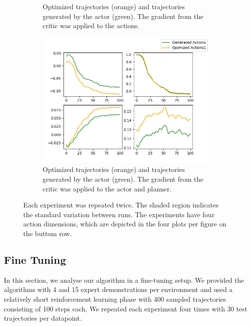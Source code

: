 \begin{figure}[htbp]
\begin{subfigure}[t]{0.45\textwidth}
      \caption{Optimized trajectories (orange) and trajectories generated by the actor (green). The gradient from the critic was applied to the actions.}
      \label{fig:direct_actions}
    \end{subfigure}
    \hfill
    \begin{subfigure}[t]{0.45\textwidth}
      \includegraphics[width=\textwidth]{images/Plan_vs_Actions/changes/plans_actor_0.png}
      \caption{Optimized trajectories (orange) and trajectories generated by the actor (green). The gradient from the critic was applied to the actor and planner.}
      \label{fig:ac_pl_actions}
    \end{subfigure}
    \caption{Each experiment was repeated twice. The shaded region indicates the standard variation between runs. 
      The experiments have four action dimensions, which are depicted in the 
      four plots per figure on the buttom row.}
    \label{fig:action_vs_actor}
\end{figure}

\subsection{Fine Tuning}
\label{sec:fine_tuning}
In this section, we analyse our algorithm in a fine-tuning setup. We provided the algorithms with 4 and 15 expert demonstrations per 
environment and used a relatively short reinforcement learning phase with 400 sampled trajectories consisting of 100 steps each. We 
repeated each experiment four times with 30 test trajectories per datapoint.\\

